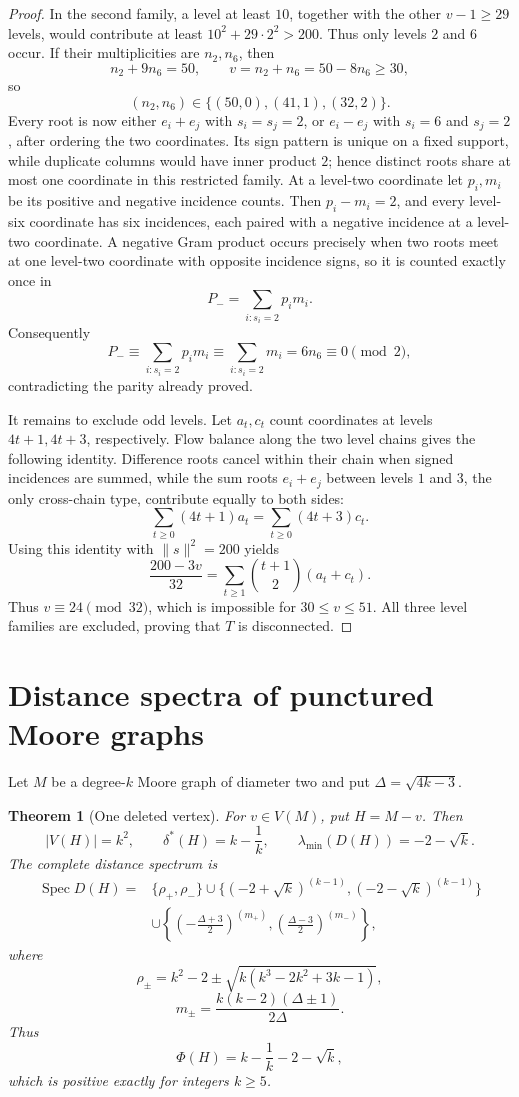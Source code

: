 \documentclass[a4paper,10pt,reqno]{amsart}
\theoremstyle{plain}
\newtheorem{theorem}{Theorem}[section]
\theoremstyle{definition}
\theoremstyle{remark}
\newcommand{\Spec}{\operatorname{Spec}}
\begin{document}
\begin{proof}
In the second family, a level at least \(10\), together with the other
\(v-1\ge29\) levels, would contribute at least
\(10^2+29\cdot2^2>200\).  Thus only levels \(2\) and \(6\) occur.  If their
multiplicities are \(n_2,n_6\), then
\[
n_2+9n_6=50,\qquad
v=n_2+n_6=50-8n_6\ge30,
\]
so
\[
(n_2,n_6)\in\{(50,0),(41,1),(32,2)\}.
\]
Every root is now either \(e_i+e_j\) with \(s_i=s_j=2\), or
\(e_i-e_j\) with \(s_i=6\) and \(s_j=2\), after ordering the two coordinates.
Its sign pattern is unique on a fixed support, while duplicate columns would
have inner product \(2\); hence distinct roots share at most one coordinate
in this restricted family.  At a level-two coordinate let \(p_i,m_i\) be its
positive and negative incidence counts.  Then \(p_i-m_i=2\), and every
level-six coordinate has six incidences, each paired with a negative incidence
at a level-two coordinate.  A
negative Gram product occurs precisely when two roots meet at one level-two
coordinate with opposite incidence signs, so it is counted exactly once in
\[
P_-=\sum_{i:s_i=2}p_im_i.
\]
Consequently
\[
P_-\equiv\sum_{i:s_i=2} p_im_i
\equiv\sum_{i:s_i=2} m_i
=6n_6
\equiv0\pmod2,
\]
contradicting the parity already proved.

It remains to exclude odd levels.  Let \(a_t,c_t\) count coordinates at
levels \(4t+1,4t+3\), respectively.  Flow balance along the two level chains
gives the following identity.  Difference roots cancel within their chain
when signed incidences are summed, while the sum roots \(e_i+e_j\) between levels
\(1\) and \(3\), the only cross-chain type, contribute equally to both sides:
\[
\sum_{t\ge0}(4t+1)a_t
=\sum_{t\ge0}(4t+3)c_t.
\]
Using this identity with \(\lVert s\rVert^2=200\) yields
\[
\frac{200-3v}{32}
=\sum_{t\ge1}\binom{t+1}{2}(a_t+c_t).
\]
Thus \(v\equiv24\pmod {32}\), which is impossible for
\(30\le v\le51\).  All three level families are excluded, proving that \(T\)
is disconnected.
\end{proof}

\section{Distance spectra of punctured Moore graphs}\label{sec:punctures}

Let \(M\) be a degree-\(k\) Moore graph of diameter two and put
\(\Delta=\sqrt{4k-3}\).

\begin{theorem}[One deleted vertex]\label{thm:one-puncture}
For \(v\in V(M)\), put \(H=M-v\).  Then
\[
 |V(H)|=k^2,
 \qquad \delta^*(H)=k-\frac1k,
 \qquad \lambda_{\min}(D(H))=-2-\sqrt{k}.
\]
The complete distance spectrum is
\begin{align*}
\Spec D(H)={}&\{\rho_+,\rho_-\}
 \cup\{(-2+\sqrt{k})^{(k-1)},(-2-\sqrt{k})^{(k-1)}\}\\
&\cup\left\{\left(-\frac{\Delta+3}{2}\right)^{(m_+)},
\left(\frac{\Delta-3}{2}\right)^{(m_-)}\right\},
\end{align*}
where
\[
 \rho_\pm=k^2-2\pm\sqrt{k(k^3-2k^2+3k-1)},
\]
\[
 m_\pm=\frac{k(k-2)(\Delta\pm1)}{2\Delta}.
\]
Thus
\[
 \Phi(H)=k-\frac1k-2-\sqrt{k},
\]
which is positive exactly for integers \(k\ge5\).
\end{theorem}
\end{document}

